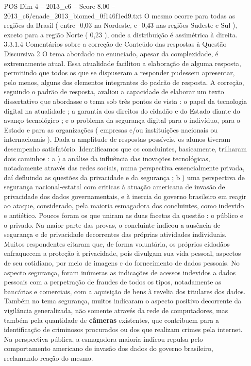 \begin{textsample}{POS Dim 4 – 2013\_c6 – Score 8.00 – 2013\_c6/enade\_2013\_biomed\_0f146f1ed9.txt}
O mesmo ocorre para todas as regiões da Brasil ( entre -0,03 na Nordeste, e -0,43 nas regiões Sudeste e Sul ), exceto para a região Norte ( 0,23 ), onde a distribuição é assimétrica à direita. 3.3.1.4 Comentários sobre a correção de Conteúdo das respostas à Questão Discursiva 2 O tema abordado no enunciado, apesar da complexidade, é extremamente atual.
Essa atualidade facilitou a elaboração de alguma resposta, permitindo que todos os que se dispuseram a responder pudessem apresentar, pelo menos, alguns dos elementos integrantes do padrão de resposta.
A correção, seguindo o padrão de resposta, avaliou a capacidade de elaborar um texto dissertativo que abordasse o tema sob três pontos de vista : o papel da tecnologia digital na atualidade ; a garantia dos direitos do cidadão e do Estado diante do avanço tecnológico ; e o problema da segurança digital para o indivíduo, para o Estado e para as organizações ( empresas e/ou instituições nacionais ou internacionais ).
Dada a amplitude de respostas possíveis, os alunos tiveram desempenho satisfatório.
Identificamos que os concluintes, basicamente, trilharam dois caminhos : a ) a análise da influência das inovações tecnológicas, notadamente através das redes sociais, numa perspectiva essencialmente privada, daí defluindo as questões da privacidade e da segurança ; b ) uma perspectiva de segurança nacional-estatal com criticas à atuação americana de invasão de privacidade dos dados governamentais, e à inercia do governo brasileiro em reagir ao ataque, considerado, pela maioria esmagadora dos concluintes, como indevido e antiético.
Poucos foram os que uniram as duas facetas da questão : o público e o privado.
Na maior parte das provas, o concluinte indicou a ausência de segurança e de privacidade decorrentes das próprias atividades individuais.
Muitos respondentes citaram que, de forma voluntária, os próprios cidadãos enfraquecem a proteção à privacidade, pois divulgam sua vida pessoal, aspectos de seu cotidiano, por meio de imagens e do fornecimento de dados pessoais.
No aspecto segurança, foram inúmeras as indicações de acessos indevidos a dados pessoais com a perpetração de fraudes de todos os tipos, notadamente as bancárias e comerciais, com a aquisição de bens à revelia dos titulares dos dados.
Também no tema segurança, muitos indicaram o aspecto positivo decorrente da vigilância generalizada, não somente através da rede de computadores, mas também pela quantidade de \textbf{câmeras} existentes, que contribuem para a identificação de criminosos procurados ou dos que realizam crimes pela internet.
Na perspectiva pública, a esmagadora maioria indicou repulsa pelo comportamento americano de invasão dos dados do governo brasileiro, reclamando reação do mesmo.

\end{textsample}
